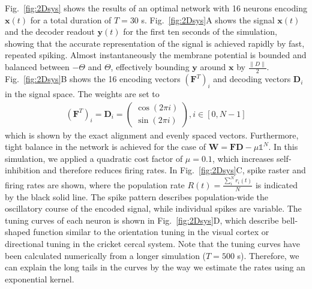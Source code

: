 \documentclass[twoside,twocolumn]{article}
\renewcommand{\b}[1]{\textbf{#1}}
\begin{document}
Fig.~\ref{fig:2Dsys} shows the results of an optimal network with 16 neurons encoding $\b{x}(t)$ for a total duration of $T=30$ s. Fig.~\ref{fig:2Dsys}A shows the signal $\b{x}(t)$ and the decoder readout $\b{y}(t)$ for the first ten seconds of the simulation, showing that the accurate representation of the signal is achieved rapidly by fast, repeated spiking. Almost instantaneously the membrane potential is bounded and balanced between $-\Theta$ and $\Theta$, effectively bounding $\b{y}$ around $\b{x}$ by $\frac{\|D\|}{2}$. Fig.~\ref{fig:2Dsys}B shows the 16 encoding vectors  $(\b{F}^T)_i$ and decoding vectors $\b{D}_i$ in the signal space. The weights are set to 
\begin{align}
(\b{F}^T)_i = \b{D}_i  = \begin{pmatrix}
\cos(2\pi i) \\
\sin(2\pi i)
\end{pmatrix},  i \in [0, N-1]
\end{align}
which is shown by the exact alignment and evenly spaced vectors. Furthermore, tight balance in the network is achieved for the case of $\b{W}=\b{F}\b{D} - \mu \mathbb{1}^N$. In this simulation, we applied a quadratic cost factor of $\mu=0.1$, which increases self-inhibition and therefore reduces firing rates. In Fig.~\ref{fig:2Dsys}C, spike raster and firing rates are shown, where the population rate $R(t) = \frac{\sum_i^Nr_i(t)}{N}$ is indicated by the black solid line. The spike pattern describes population-wide the oscillatory course of the encoded signal, while individual spikes are variable. The tuning curves of each neuron is shown in Fig.~\ref{fig:2Dsys}D, which describe bell-shaped function similar to the orientation tuning in the visual cortex or directional tuning in the cricket cercal system. Note that the tuning curves have been calculated numerically from a longer simulation ($T=500$ s). Therefore, we can explain the long tails in the curves by the way we estimate the rates using an exponential kernel.
\end{document}

